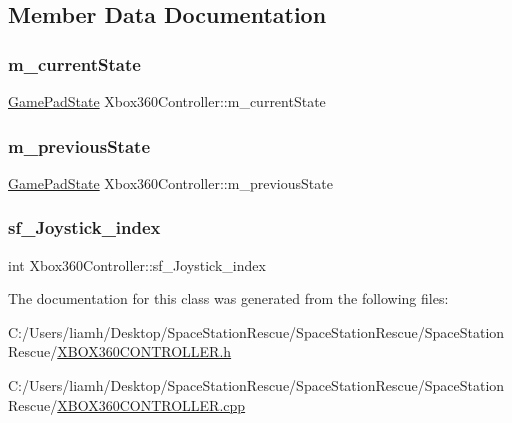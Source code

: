 \subsection{Member Data Documentation}
\mbox{\label{class_xbox360_controller_ae16ab40180c31e353d1a99696508279a}} 
\subsubsection{\texorpdfstring{m\_currentState}{m\_currentState}}
{\footnotesize\ttfamily \mbox{\hyperlink{struct_game_pad_state}{Game\+Pad\+State}} Xbox360\+Controller\+::m\+\_\+current\+State}

\mbox{\label{class_xbox360_controller_a42cfca3db7ee70dd11fb39d30b3d5cb5}} 
\subsubsection{\texorpdfstring{m\_previousState}{m\_previousState}}
{\footnotesize\ttfamily \mbox{\hyperlink{struct_game_pad_state}{Game\+Pad\+State}} Xbox360\+Controller\+::m\+\_\+previous\+State}

\mbox{\label{class_xbox360_controller_afe596ab17748d78b7c09495fe04df62d}} 
\subsubsection{\texorpdfstring{sf\_Joystick\_index}{sf\_Joystick\_index}}
{\footnotesize\ttfamily int Xbox360\+Controller\+::sf\+\_\+\+Joystick\+\_\+index}



The documentation for this class was generated from the following files\+:\begin{DoxyCompactItemize}
\item 
C\+:/\+Users/liamh/\+Desktop/\+Space\+Station\+Rescue/\+Space\+Station\+Rescue/\+Space\+Station\+Rescue/\mbox{\hyperlink{_x_b_o_x360_c_o_n_t_r_o_l_l_e_r_8h}{X\+B\+O\+X360\+C\+O\+N\+T\+R\+O\+L\+L\+E\+R.\+h}}\item 
C\+:/\+Users/liamh/\+Desktop/\+Space\+Station\+Rescue/\+Space\+Station\+Rescue/\+Space\+Station\+Rescue/\mbox{\hyperlink{_x_b_o_x360_c_o_n_t_r_o_l_l_e_r_8cpp}{X\+B\+O\+X360\+C\+O\+N\+T\+R\+O\+L\+L\+E\+R.\+cpp}}\end{DoxyCompactItemize}
